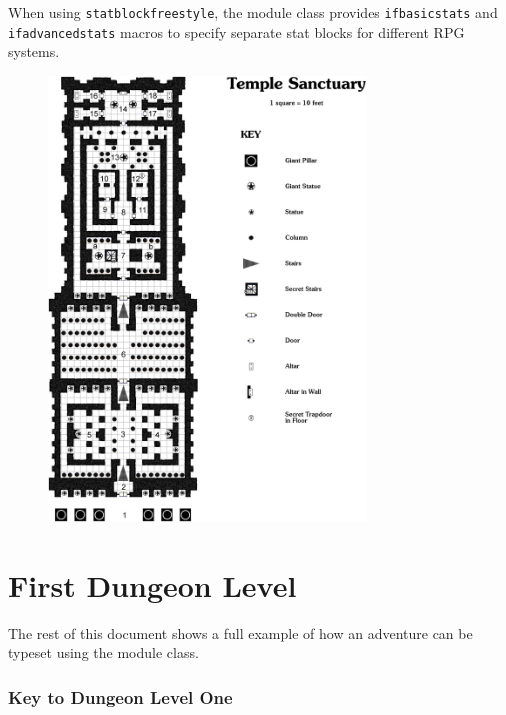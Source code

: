 \documentclass[letterpaper,serif]{module}
\begin{document}
\noindent When using \verb|statblockfreestyle|, the module class provides \verb|ifbasicstats| and \verb|ifadvancedstats| macros to specify separate
stat blocks for different RPG systems.



\begin{figure}[p]
\centering
\includegraphics[width=0.75\textwidth]{module_map.png}
\vspace{2em}
\label{img:map}
\end{figure}

\part{First Dungeon Level}

The rest of this document shows a full example of how an adventure can be typeset using the module class.

\section*{Key to Dungeon Level One}
\end{document}

